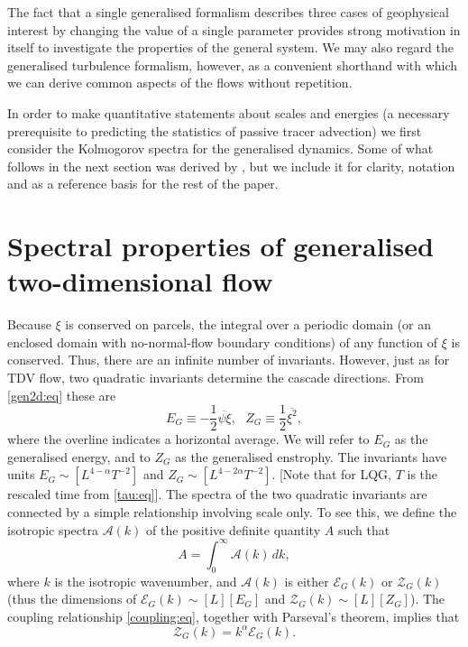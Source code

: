 \documentclass{jfm}
\newcommand{\ca}  [1]{\mathcal{#1}}
\begin{document}
The fact that a single generalised formalism describes three cases of
geophysical interest by changing the value of a single parameter
provides strong motivation in itself to investigate the properties of
the general system. We may also regard the generalised turbulence
formalism, however, as a convenient shorthand with which we can derive
common aspects of the flows without repetition.

In order to make quantitative statements about scales and
energies (a necessary prerequisite to predicting the statistics
of passive tracer advection) we first consider the Kolmogorov
spectra for the generalised dynamics.  Some of what follows in
the next section was derived by \citet{Pierrehumbert94}, but we
include it for clarity, notation and as a reference basis for the
rest of the paper.

\section{Spectral properties of generalised two-dimensional flow}
\label{spectra:sec}

Because $\xi$ is conserved on parcels, the integral over a periodic
domain (or an enclosed domain with no-normal-flow boundary conditions)
of any function of $\xi$ is conserved. Thus, there are an infinite
number of invariants. However, just as for TDV flow, two quadratic
invariants determine the cascade directions. From \eqref{gen2d:eq}
these are
\begin{equation}
E_G\equiv-\frac{1}{2}\overline{\psi\xi},~~~
Z_G\equiv\frac{1}{2}\overline{\xi^2},
\label{invar:eq}
\end{equation}
where the overline indicates a horizontal average.  We will refer to
$E_G$ as the generalised energy, and to $Z_G$ as the generalised
enstrophy. The invariants have units $E_G \sim [L^{4-\alpha}T^{-2}]$
and $Z_G \sim [L^{4-2\alpha}T^{-2}]$.  [Note that for LQG, $T$ is the
rescaled time from \eqref{tau:eq}]. The spectra of the two quadratic
invariants are connected by a simple relationship involving scale
only. To see this, we define the isotropic spectra $\ca{A}(k)$ of the
positive definite quantity $A$ such that
\begin{equation}
A = \int_0^{\infty}\ca{A}(k) \, dk,
\label{Adef:eq}
\end{equation}
where $k$ is the isotropic wavenumber, and $\ca{A}(k)$ is either
$\ca{E}_G(k)$ or $\ca{Z}_G(k)$ (thus the dimensions of $\ca{E}_G(k)
\sim [L][E_G]$ and $\ca{Z}_G(k) \sim [L][Z_G]$). The coupling
relationship \eqref{coupling:eq}, together with Parseval's theorem,
implies that
\begin{equation}
\ca{Z}_G(k) = k^{\alpha}\ca{E}_G(k).
\label{EZ:eq}
\end{equation}
\end{document}
